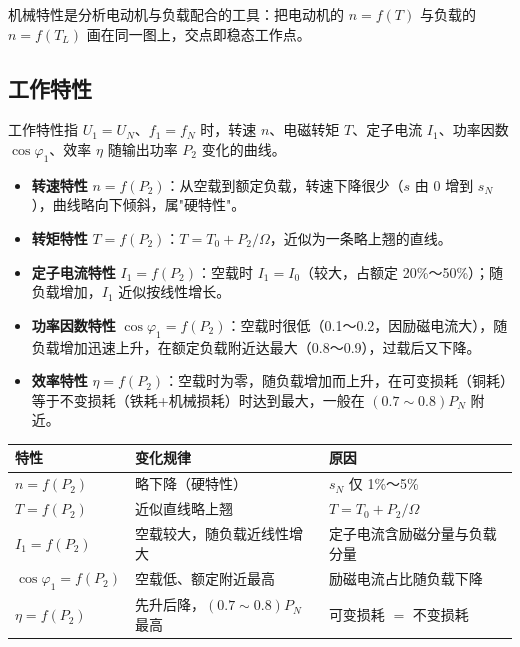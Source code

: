 机械特性是分析电动机与负载配合的工具：把电动机的 $n=f(T)$ 与负载的 $n=f(T_L)$ 画在同一图上，交点即稳态工作点。

\subsection{工作特性}
工作特性指 $U_1=U_N$、$f_1=f_N$ 时，转速 $n$、电磁转矩 $T$、定子电流 $I_1$、功率因数 $\cos\varphi_1$、效率 $\eta$ 随输出功率 $P_2$ 变化的曲线。

\begin{itemize}
  \item \textbf{转速特性} $n=f(P_2)$：从空载到额定负载，转速下降很少（$s$ 由 0 增到 $s_N$），曲线略向下倾斜，属"硬特性"。
  \item \textbf{转矩特性} $T=f(P_2)$：$T=T_0+P_2/\Omega$，近似为一条略上翘的直线。
  \item \textbf{定子电流特性} $I_1=f(P_2)$：空载时 $I_1=I_0$（较大，占额定 20\%～50\%）；随负载增加，$I_1$ 近似按线性增长。
  \item \textbf{功率因数特性} $\cos\varphi_1=f(P_2)$：空载时很低（0.1～0.2，因励磁电流大），随负载增加迅速上升，在额定负载附近达最大（0.8～0.9），过载后又下降。
  \item \textbf{效率特性} $\eta=f(P_2)$：空载时为零，随负载增加而上升，在可变损耗（铜耗）等于不变损耗（铁耗+机械损耗）时达到最大，一般在 $(0.7\sim0.8)P_N$ 附近。
\end{itemize}

\begin{center}
\begin{tabular}{@{}lll@{}}
\toprule
特性 & 变化规律 & 原因 \\
\midrule
$n=f(P_2)$ & 略下降（硬特性） & $s_N$ 仅 1\%～5\% \\
$T=f(P_2)$ & 近似直线略上翘 & $T=T_0+P_2/\Omega$ \\
$I_1=f(P_2)$ & 空载较大，随负载近线性增大 & 定子电流含励磁分量与负载分量 \\
$\cos\varphi_1=f(P_2)$ & 空载低、额定附近最高 & 励磁电流占比随负载下降 \\
$\eta=f(P_2)$ & 先升后降，$(0.7\sim0.8)P_N$ 最高 & 可变损耗 $=$ 不变损耗 \\
\bottomrule
\end{tabular}
\end{center}


